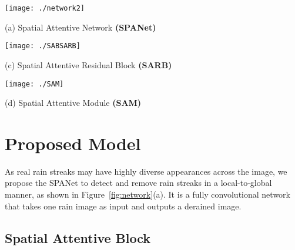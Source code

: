 \documentclass[10pt,twocolumn,letterpaper]{article}
\begin{document}
\begin{figure*}[htbp]
\begin{minipage}[t]{\textwidth}
\centering
\texttt{[image: ./network2]}
\centerline{\footnotesize (a) Spatial Attentive Network \textbf{(SPANet)}}
\end{minipage}
\space{}
\begin{minipage}[t]{0.4\textwidth}
\centering
\texttt{[image: ./SABSARB]}
\centerline{\footnotesize (c) Spatial Attentive Residual Block \textbf{(SARB)}}
\end{minipage}
\begin{minipage}[t]{0.6\textwidth}
\centering
\texttt{[image: ./SAM]}	
\centerline{\footnotesize (d) Spatial Attentive Module \textbf{(SAM)}}
\end{minipage}
\space{\ }
\caption{The architecture of the proposed \textbf{SPANet} (a). It adopts three standard residual blocks ({\bf RB}s)~\cite{he:cvpr:2016:resnet} to extract features, four spatial attentive blocks ({\bf SAB}s) to identify rain streaks progressively in four stages, and two residual blocks to reconstruct a clean background. A {\bf SAB} (b) contains three spatial attentive residual blocks ({\bf SARB}s) (c) and one spatial attentive module ({\bf SAM}) (d). Dilation convolutions~\cite{yu:iclr:2015:dilated} are used in {\bf RB}s and {\bf SARB}s.}
\label{fig:network}
\vspace{-3mm}
\end{figure*}



\section{Proposed Model}\label{sec:spanet}

As real rain streaks may have highly diverse appearances across the image, we propose the SPANet to detect and remove rain streaks in a local-to-global manner, as shown in Figure~\ref{fig:network}(a). It is a fully convolutional network that takes one rain image as input and outputs a derained image.

\subsection{Spatial Attentive Block}
\end{document}
